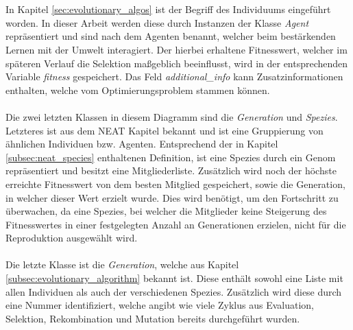 \\\\
In Kapitel \ref{sec:evolutionary_algos} ist der Begriff des Individuums eingeführt worden. In dieser Arbeit werden diese durch Instanzen der Klasse \emph{Agent} repräsentiert und sind nach dem Agenten benannt, welcher beim bestärkenden Lernen mit der Umwelt interagiert. Der hierbei erhaltene Fitnesswert, welcher im späteren Verlauf die Selektion maßgeblich beeinflusst, wird in der entsprechenden Variable \emph{fitness} gespeichert. Das Feld \emph{additional\_info} kann Zusatzinformationen enthalten, welche vom Optimierungsproblem stammen können.
\\\\
Die zwei letzten Klassen in diesem Diagramm sind die \emph{Generation} und \emph{Spezies}. Letzteres ist aus dem \ac{NEAT} Kapitel bekannt und ist eine Gruppierung von ähnlichen Individuen bzw. Agenten. Entsprechend der in Kapitel \ref{subsec:neat_species} enthaltenen Definition, ist eine Spezies durch ein Genom repräsentiert und besitzt eine Mitgliederliste. Zusätzlich wird noch der höchste erreichte Fitnesswert von dem besten Mitglied gespeichert, sowie die Generation, in welcher dieser Wert erzielt wurde. Dies wird benötigt, um den Fortschritt zu überwachen, da eine Spezies, bei welcher die Mitglieder keine Steigerung des Fitnesswertes in einer festgelegten Anzahl an Generationen erzielen, nicht für die Reproduktion ausgewählt wird.
\\\\
Die letzte Klasse ist die \emph{Generation}, welche aus Kapitel \ref{subsec:evolutionary_algorithm} bekannt ist. Diese enthält sowohl eine Liste mit allen Individuen als auch der verschiedenen Spezies. Zusätzlich wird diese durch eine Nummer identifiziert, welche angibt wie viele Zyklus aus Evaluation, Selektion, Rekombination und Mutation bereits durchgeführt wurden.

